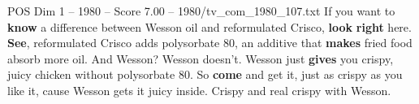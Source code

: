 \begin{textsample}{POS Dim 1 – 1980 – Score 7.00 – 1980/tv\_com\_1980\_107.txt}  \label{ex:f1_pos_041}
If you want to \textbf{know} a difference between Wesson oil and reformulated Crisco, \textbf{look} \textbf{right} here. \textbf{See}, reformulated Crisco adds polysorbate 80, an additive that \textbf{makes} fried food absorb more oil.
And Wesson?
Wesson doesn't.
Wesson just \textbf{gives} you crispy, juicy chicken without polysorbate 80.
So \textbf{come} and get it, just as crispy as you like it, cause Wesson gets it juicy inside.
Crispy and real crispy with Wesson.

\end{textsample}

